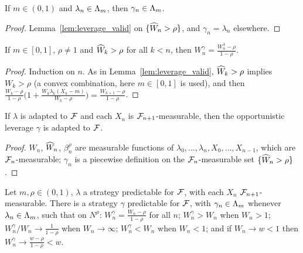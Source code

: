 \begin{lemma}
  \label{lem:opp_leverage_valid}
  \leanok
  If $m \in (0,1)$ and $\lambda_n \in \Lambda_m$, then $\gamma_n \in \Lambda_m$.
\end{lemma}

\begin{proof}
  \leanok
  Lemma~\ref{lem:leverage_valid} on $\{\widehat{W}_n > \rho\}$, and $\gamma_n = \lambda_n$ elsewhere.
\end{proof}

\begin{lemma}
  \label{lem:wealth_opp_leverage}
  \leanok
  If $m \in [0, 1]$, $\rho \ne 1$ and $\widehat{W}_k > \rho$ for all $k < n$, then
  $W^\gamma_n = \frac{W^\lambda_n - \rho}{1 - \rho}$.
\end{lemma}

\begin{proof}
  \leanok
  Induction on $n$. As in Lemma~\ref{lem:leverage_valid}, $\widehat{W}_k > \rho$ implies $W_k > \rho$ (a
  convex combination, here $m \in [0,1]$ is used), and then
  $\frac{W_k - \rho}{1-\rho}\big(1 + \frac{W_k\lambda_k(X_k - m)}{W_k - \rho}\big) =
  \frac{W_{k+1} - \rho}{1-\rho}$.
\end{proof}

\begin{lemma}
  \label{lem:measurable_oppLeverage}
  \leanok
  If $\lambda$ is adapted to $\mathcal{F}$ and each $X_n$ is $\mathcal{F}_{n+1}$-measurable, then the opportunistic
  leverage $\gamma$ is adapted to $\mathcal{F}$.
\end{lemma}

\begin{proof}
  \leanok
  $W_n$, $\widehat{W}_n$, $\beta^\rho_n$ are measurable functions of $\lambda_0, \dots, \lambda_n, X_0,
  \dots, X_{n-1}$, which are $\mathcal{F}_n$-measurable; $\gamma_n$ is a piecewise definition on the
  $\mathcal{F}_n$-measurable set $\{\widehat{W}_n > \rho\}$.
\end{proof}

\begin{theorem}
  \label{thm:improve}
  \leanok
  Let $m, \rho \in (0,1)$, $\lambda$ a strategy predictable for $\mathcal{F}$, with each $X_n$
  $\mathcal{F}_{n+1}$-measurable. There is a strategy $\gamma$ predictable for $\mathcal{F}$, with $\gamma_n \in \Lambda_m$
  whenever $\lambda_n \in \Lambda_m$, such that on $N^\rho$: $W^\gamma_n = \frac{W_n - \rho}{1-\rho}$ for
  all $n$; $W^\gamma_n > W_n$ when $W_n > 1$; $W^\gamma_n / W_n \to \frac{1}{1-\rho}$ when
  $W_n \to \infty$; $W^\gamma_n < W_n$ when $W_n < 1$; and if $W_n \to w < 1$ then $W^\gamma_n \to
  \frac{w - \rho}{1-\rho} < w$.
\end{theorem}

